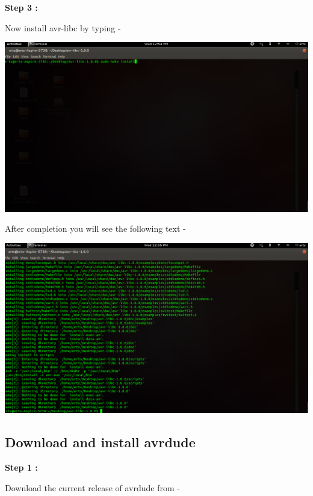 \begin{flushleft}
\medskip

\textbf{Step 3 :}
 
Now install avr-libc by typing - 

\medskip


\medskip

\includegraphics[scale=0.3]{f16}

\medskip

After completion you will see the following text - 

\medskip

\includegraphics[scale=0.3]{f17}

\medskip

\subsection{Download and install avrdude}

\textbf{Step 1 : }

\medskip

Download the current release of avrdude from -


\end{flushleft}
